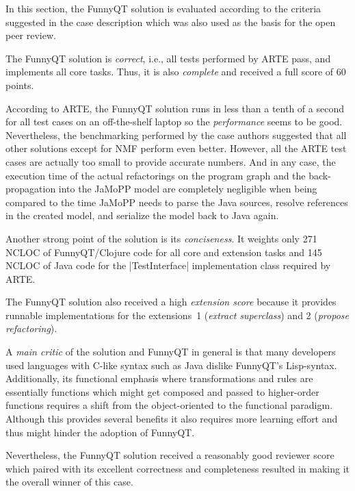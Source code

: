 \documentclass[submission]{eptcs}
\newcommand{\code}{\clojureinline}
\begin{document}
In this section, the FunnyQT solution is evaluated according to the criteria
suggested in the case description which was also used as the basis for the open
peer review.

The FunnyQT solution is \emph{correct}, i.e., all tests performed by ARTE pass,
and implements all core tasks.  Thus, it is also \emph{complete} and received a
full score of 60 points.

According to ARTE, the FunnyQT solution runs in less than a tenth of a second
for all test cases on an off-the-shelf laptop so the \emph{performance} seems
to be good.  Nevertheless, the benchmarking performed by the case authors
suggested that all other solutions except for NMF perform even better.
However, all the ARTE test cases are actually too small to provide accurate
numbers.  And in any case, the execution time of the actual refactorings on the
program graph and the back-propagation into the JaMoPP model are completely
negligible when being compared to the time JaMoPP needs to parse the Java
sources, resolve references in the created model, and serialize the model back
to Java again.

Another strong point of the solution is its \emph{conciseness}.  It weights
only 271 NCLOC of FunnyQT/Clojure code for all core and extension tasks and 145
NCLOC of Java code for the \code|TestInterface| implementation class required
by ARTE.

The FunnyQT solution also received a high \emph{extension score} because it
provides runnable implementations for the extensions~1 (\emph{extract
  superclass}) and 2 (\emph{propose refactoring}).

A \emph{main critic} of the solution and FunnyQT in general is that many
developers used languages with C-like syntax such as Java dislike FunnyQT's
Lisp-syntax.  Additionally, its functional emphasis where transformations and
rules are essentially functions which might get composed and passed to
higher-order functions requires a shift from the object-oriented to the
functional paradigm.  Although this provides several benefits it also requires
more learning effort and thus might hinder the adoption of FunnyQT.

Nevertheless, the FunnyQT solution received a reasonably good reviewer score
which paired with its excellent correctness and completeness resulted in making
it the overall winner of this case.




\end{document}
